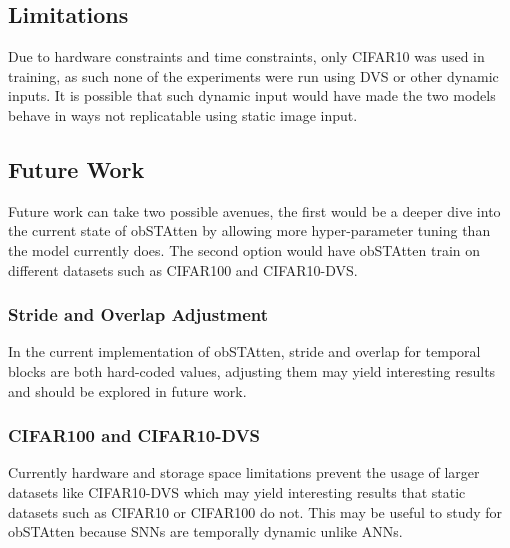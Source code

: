 \documentclass[../main.tex]{subfiles}
\begin{document}
\subsection{Limitations}
Due to hardware constraints and time constraints, only CIFAR10 was used in training, as such none of the experiments were run using DVS or other dynamic inputs. It is possible that such dynamic input would have made the two models behave in ways not replicatable using static image input.

\subsection{Future Work}
Future work can take two possible avenues, the first would be a deeper dive into the current state of obSTAtten by allowing more hyper-parameter tuning than the model currently does. The second option would have obSTAtten train on different datasets such as CIFAR100\cite{cifar10} and CIFAR10-DVS. 

\subsubsection{Stride and Overlap Adjustment}
In the current implementation of obSTAtten, stride and overlap for temporal blocks are both hard-coded values, adjusting them may yield interesting results and should be explored in future work.

\subsubsection{CIFAR100 and CIFAR10-DVS}
Currently hardware and storage space limitations prevent the usage of larger datasets like CIFAR10-DVS which may yield interesting results that static datasets such as CIFAR10 or CIFAR100 do not. This may be useful to study for obSTAtten because SNNs are temporally dynamic unlike ANNs.
\end{document}
